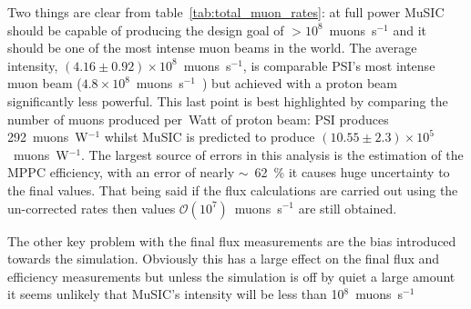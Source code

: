 Two things are clear from table~\ref{tab:total_muon_rates}: at full power MuSIC should be capable of producing the design goal of \(>10^8\)~muons~s\(^{-1}\) and it should be one of the most intense muon beams in the world. The average intensity, \((4.16\pm0.92)\times10^8\)~muons~s\(^{-1}\), is comparable PSI's most intense muon beam (\(4.8\times10^8\)~muons~s\(^{-1}\)~\cite{mue4_psi}) but achieved with a proton beam significantly less powerful. This last point is best highlighted by comparing the number of muons produced per~Watt of proton beam: PSI produces 292~muons~W\(^{-1}\) whilst MuSIC is predicted to produce \((10.55\pm2.3)\times10^5\)~muons~W\(^{-1}\). The largest source of errors in this analysis is the estimation of the MPPC efficiency, with an error of nearly \(\sim\)~62~\% it causes huge uncertainty to the final values. That being said if the flux calculations are carried out using the un-corrected rates then values \(\mathcal{O}(10^7)\)~muons~s\(^{-1}\) are still obtained.

The other key problem with the final flux measurements are the bias introduced towards the simulation. Obviously this has a large effect on the final flux and efficiency measurements but unless the simulation is off by quiet a large amount it seems unlikely that MuSIC's intensity will be less than 10\( ^8 \)~muons~s\( ^{-1} \)